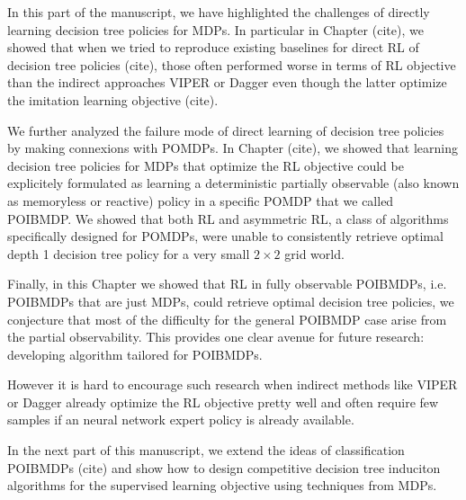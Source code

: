 In this part of the manuscript, we have highlighted the challenges of directly learning decision tree policies for MDPs.
In particular in Chapter (cite), we showed that when we tried to reproduce existing baselines for direct RL of decision tree policies (cite), those often performed worse in terms of RL objective than the indirect approaches VIPER or Dagger even though the latter optimize the imitation learning objective (cite).

We further analyzed the failure mode of direct learning of decision tree policies by making connexions with POMDPs.
In Chapter (cite), we showed that learning decision tree policies for MDPs that optimize the RL objective could be explicitely formulated as learning a deterministic partially observable (also known as memoryless or reactive) policy in a specific POMDP that we called POIBMDP.
We showed that both RL and asymmetric RL, a class of algorithms specifically designed for POMDPs, were unable to consistently retrieve optimal depth 1 decision tree policy for a very small $2\times2$ grid world.

Finally, in this Chapter we showed that RL in fully observable POIBMDPs, i.e. POIBMDPs that are just MDPs, could retrieve optimal decision tree policies, we conjecture that most of the difficulty for the general POIBMDP case arise from the partial observability.
This provides one clear avenue for future research: developing algorithm tailored for POIBMDPs.

However it is hard to encourage such research when indirect methods like VIPER or Dagger already optimize the RL objective pretty well and often require few samples if an neural network expert policy is already available.

In the next part of this manuscript, we extend the ideas of classification POIBMDPs (cite) and show how to design competitive decision tree induciton algorithms for the supervised learning objective using techniques from MDPs.

